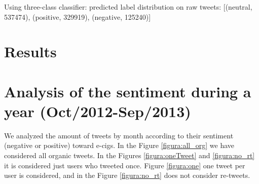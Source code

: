 \documentclass{sig-alternate}
\begin{document}
Using three-class classifier: predicted label distribution on raw tweets: [(neutral, 537474), (positive, 329919), (negative, 125240)]

\section{Results}
\label{s.results}

\section{Analysis of the sentiment during a year (Oct/2012-Sep/2013)}

We analyzed the amount of tweets by month according to their sentiment (negative or positive) toward e-cigs. In the Figure \ref{figura:all_org} we have considered all organic tweets. In the Figures \ref{figura:oneTweet} and \ref{figura:no_rt} it is considered just users who tweeted once. Figure \ref{figura:one} one tweet per user is considered, and in the Figure \ref{figura:no_rt} does not consider re-tweets.

\end{document}
